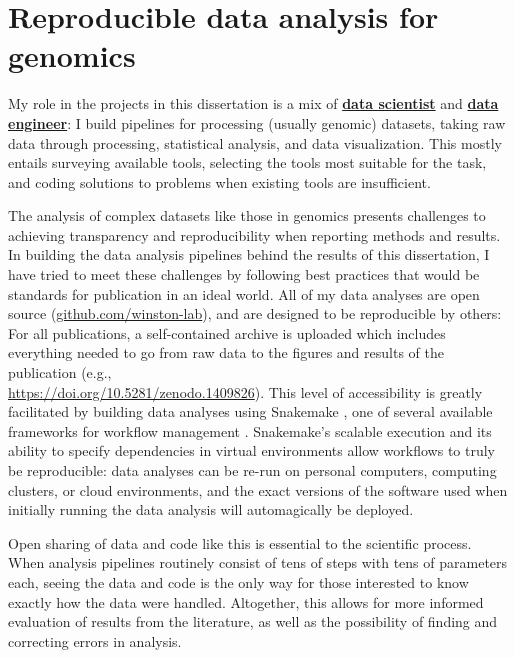 \section{Reproducible data analysis for genomics}

My role in the projects in this dissertation is a mix of \href{https://blog.insightdatascience.com/data-science-vs-data-engineering-62da7678adaa}{\textbf{data scientist}} and \href{https://blog.insightdatascience.com/data-science-vs-data-engineering-62da7678adaa}{\textbf{data engineer}}: I build pipelines for processing (usually genomic) datasets, taking raw data through processing, statistical analysis, and data visualization.
This mostly entails surveying available tools, selecting the tools most suitable for the task, and coding solutions to problems when existing tools are insufficient.

The analysis of complex datasets like those in genomics presents challenges to achieving transparency and reproducibility when reporting methods and results.
In building the data analysis pipelines behind the results of this dissertation, I have tried to meet these challenges by following best practices that would be standards for publication in an ideal world.
All of my data analyses are open source (\href{https://github.com/winston-lab}{github.com/winston-lab}), and are designed to be reproducible by others: For all publications, a self-contained archive is uploaded which includes everything needed to go from raw data to the figures and results of the publication (e.g.,\\\url{https://doi.org/10.5281/zenodo.1409826}).
This level of accessibility is greatly facilitated by building data analyses using Snakemake \citep{koster2012}, one of several available frameworks for workflow management \citep{voss2017, ditommaso2017}.
Snakemake's scalable execution and its ability to specify dependencies in virtual environments allow workflows to truly be reproducible: data analyses can be re-run on personal computers, computing clusters, or cloud environments, and the exact versions of the software used when initially running the data analysis will automagically be deployed.

Open sharing of data and code like this is essential to the scientific process.
When analysis pipelines routinely consist of tens of steps with tens of parameters each, seeing the data and code is the only way for those interested to know exactly how the data were handled.
Altogether, this allows for more informed evaluation of results from the literature, as well as the possibility of finding and correcting errors in analysis.

\clearpage

\begingroup
    \singlespacing
    
\endgroup

